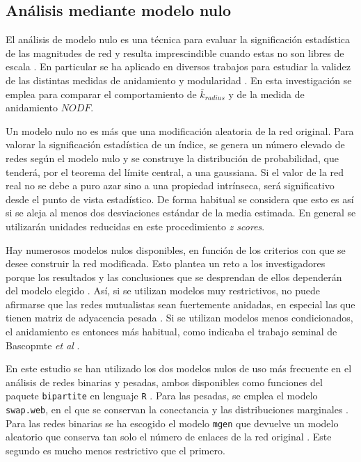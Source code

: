 \subsection{Análisis mediante modelo nulo}
\label{sec:nullmodels}

El análisis de modelo nulo es una técnica para evaluar la significación estadística de las magnitudes de red y resulta imprescindible cuando estas no son libres de escala \cite{gotelli1996null}. En particular se ha aplicado en diversos trabajos para estudiar la validez de las distintas medidas de anidamiento \cite{ulrich2013pattern, feng2014heterogeneity} y modularidad \cite{fortuna2010nestedness, mello2011modularity}. En esta investigación se emplea para comparar el comportamiento de $\overline k_{radius}$ y de la medida de anidamiento $NODF$.

Un modelo nulo no es más que una modificación aleatoria de la red original. Para valorar la significación estadística de un índice, se genera un
número elevado de redes según el modelo nulo y se construye la distribución de probabilidad, que tenderá, por el teorema del límite central, a una gaussiana. Si el valor de la red real no se debe a puro azar sino a una propiedad intrínseca, será significativo desde el punto de vista estadístico. De forma habitual se considera que esto es así
si se aleja al menos dos desviaciones estándar de la media estimada. En general se utilizarán unidades reducidas en este procedimiento \textit{z scores}.

Hay numerosos modelos nulos disponibles, en función de los criterios con que se desee construir la red modificada. Esto plantea un reto a los investigadores porque los resultados y las conclusiones que se desprendan de ellos dependerán del modelo elegido \cite{ulrich2007null,gotelli2012statistical}. Así, si se utilizan modelos muy restrictivos, no puede afirmarse que las redes mutualistas sean fuertemente anidadas, en especial las que tienen matriz de adyacencia pesada \cite{joppa2010nestedness, staniczenko2013ghost}. Si se utilizan modelos menos condicionados, el anidamiento es entonces más habitual, como indicaba el trabajo seminal de Bascopmte \textit{et al} \cite{bascompte2003nested}.

En este estudio se han utilizado los dos modelos nulos de uso más frecuente en el análisis de redes binarias y pesadas, ambos disponibles como funciones del paquete \texttt{bipartite} en lenguaje \texttt{R} \cite{dormann2008introducing}. Para las pesadas, se emplea el modelo \texttt{swap.web}, en el que se conservan la conectancia y las distribuciones marginales \cite{ dormann2009indices}. Para las redes binarias se ha escogido el modelo \texttt{mgen} que devuelve un modelo aleatorio que conserva tan solo el número de enlaces de la red original \cite{vazquez2009evaluating}. Este segundo es mucho menos restrictivo que el primero.

